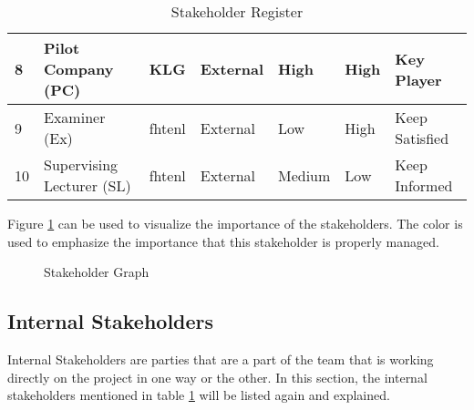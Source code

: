 \begin{table}[htbp]
{\begin{tabular}{|p{}|p{}|p{}|p{}|p{}|p{}|p{}|}
8  & Pilot Company (PC)       & KLG                   & External            & High              & High               & Key Player                \\ \hline
9  & Examiner (Ex)            & \gls{fhtenl}        & External            & Low               & High               & Keep Satisfied            \\ \hline
10  & Supervising Lecturer (SL) & \gls{fhtenl}        & External            & Medium            & Low                & Keep Informed             \\ \hline
\end{tabular}
}
\caption{Stakeholder Register}
\label{tab:stakeholder}
\end{table}

Figure \ref{fig:stakeholder} can be used to visualize the importance of the stakeholders. The color is used to emphasize the importance that this stakeholder is properly managed.

\begin{figure}[H]
	\centering
	\caption{Stakeholder Graph}
	\label{fig:stakeholder}
\end{figure}
\subsection{Internal Stakeholders}\label{ssec:internalStakeholders}
Internal Stakeholders are parties that are a part of the team that is working directly on the project in one way or the other. In this section, the internal stakeholders mentioned in table \ref{tab:stakeholder} will be listed again and explained.


